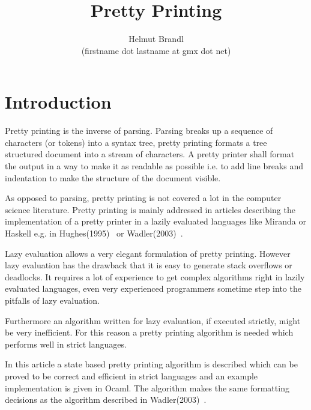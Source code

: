 \documentclass[12pt]{article}
\begin{document}
\title{Pretty Printing}
\author{Helmut Brandl \\ \scriptsize (firstname dot lastname at gmx dot net)}
\date{}

\maketitle



\tableofcontents



\section{Introduction}

Pretty printing is the inverse of parsing. Parsing breaks up a sequence of
characters (or tokens) into a syntax tree, pretty printing formats a tree
structured document into a stream of characters. A pretty printer shall format
the output in a way to make it as readable as possible i.e. to add line breaks
and indentation to make the structure of the document visible.

As opposed to parsing, pretty printing is not covered a lot in the computer
science literature. Pretty printing is mainly addressed in articles describing
the implementation of a pretty printer in a lazily evaluated languages like
Miranda or Haskell e.g. in Hughes(1995)~\cite{hughes1995} or
Wadler(2003)~\cite{wadler}.

Lazy evaluation allows a very elegant formulation of pretty printing. However
lazy evaluation has the drawback that it is easy to generate stack overflows
or deadlocks. It requires a lot of experience to get complex algorithms right
in lazily evaluated languages, even very experienced programmers sometime step
into the pitfalls of lazy evaluation.

Furthermore an algorithm written for lazy evaluation, if executed strictly,
might be very inefficient. For this reason a pretty printing algorithm is
needed which performs well in strict languages.

In this article a state based pretty printing algorithm is described which can
be proved to be correct and efficient in strict languages and an example
implementation is given in Ocaml. The algorithm makes the same formatting
decisions as the algorithm described in Wadler(2003)~\cite{wadler}.
\end{document}
